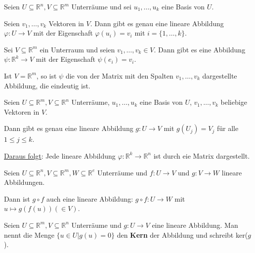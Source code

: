 \documentclass{mg2}
\begin{document}
\begin{satz}
Seien $U \subseteq \mathbb{R}^n, V \subseteq \mathbb{R}^m$ Unterräume und sei $u_1,\dots,u_k$ eine Basis von $U$.

Seien $v_1,\dots,v_k$ Vektoren in $V$. Dann gibt es genau eine lineare Abbildung $\varphi: U \to V$ mit der Eigenschaft $\varphi(u_i) = v_i$ mit $i = \{1,\dots,k\}$.
\end{satz}

\begin{beobachtung}
Sei $V \subseteq \mathbb{R}^m$ ein Unterraum und seien $v_1,\dots,v_k \in V$. Dann gibt es eine Abbildung $\psi: \mathbb{R}^k \to V$ mit der Eigenschaft $\psi(e_i) = v_i$.

Ist $V = \mathbb{R}^m$, so ist $\psi$ die von der Matrix mit den Spalten $v_1,\dots,v_k$ dargestellte Abbildung, die eindeutig ist.
\end{beobachtung}

\begin{satz}
Seien $U \subseteq \mathbb{R}^m, V \subseteq \mathbb{R}^n$ Unterräume, $u_1,\dots,u_k$ eine Basis von $U$, $v_1,\dots,v_k$ beliebige Vektoren in $V$.

Dann gibt es genau eine lineare Abbildung $g: U \to V$ mit $g(U_j) = V_j$ für alle $1 \leq j \leq k$.

\underline{Daraus folgt}: Jede lineare Abbildung $\varphi: \mathbb{R}^k \to \mathbb{R}^n$ ist durch eie Matrix dargestellt.
\end{satz}

\begin{satz}
Seien $U \subseteq \mathbb{R}^n, V \subseteq \mathbb{R}^m, W \subseteq \mathbb{R}^e$ Unterräume und $f: U \to V$ und $g: V \to W$ lineare Abbildungen.

Dann ist $g \circ f$ auch eine lineare Abbildung: $g \circ f: U \to W$ mit $u \mapsto g(f(u)) (\in V)$.
\end{satz}

\begin{satz}
Seien $U \subseteq \mathbb{R}^m, V \subseteq \mathbb{R}^n$ Unterräume und $g: U \to V$ eine lineare Abbildung. Man nennt die Menge $\{u \in U | g(u) = 0\}$ den \textbf{Kern} der Abbildung und schreibt ker($g$).
\end{satz}
\end{document}
